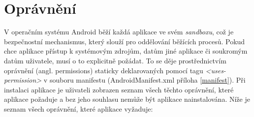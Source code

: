 \documentclass{diplomka}
\begin{document}
\section{Oprávnění}
\label{sec:persmissions}
V operačním systému Android běží každá aplikace ve svém \emph{sandboxu}, což je bezpečnostní mechanismus, který slouží pro oddělování běžících procesů. Pokud chce aplikace přístup k systémovým zdrojům, datům jiné aplikace či soukromým datům uživatele, musí o to explicitně požádat. To se děje prostřednictvím oprávnění (angl. permissions) staticky deklarovaných pomocí tagu \emph{<uses-permission>} v souboru manifestu (AndroidManifest.xml příloha \ref{manifest}). Při instalaci aplikace je uživateli zobrazen seznam všech těchto oprávnění, které aplikace požaduje a bez jeho souhlasu nemůže být aplikace nainstalována. Níže je seznam všech oprávnění, které aplikace vyžaduje:
\end{document}
